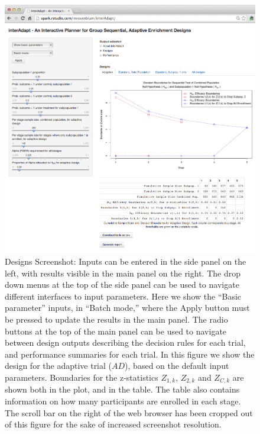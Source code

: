 \documentclass[article]{jss}
\begin{document}
\begin{figure}[h]
\centering{}\includegraphics[width=1\textwidth]{2014-02-29_screenshot_designs.png} 
\caption{Designs Screenshot: Inputs can be entered in the side panel on the left, with results visible in the main panel on the right. The drop down menus at the top of the side panel can be used to navigate different interfaces to input parameters. Here we show the ``Basic parameter'' inputs, in ``Batch mode,'' where the Apply button must be pressed to update the results in the main panel. The radio buttons at the top of the main panel can be used to navigate between design outputs describing the decision rules for each trial, and performance summaries for each trial. In this figure we show the design for the adaptive trial ($AD$), based on the default input parameters. Boundaries for the z-statistics $Z_{1,k}$, $Z_{2,k}$ and $Z_{C,k}$ are shown both in the plot, and in the table. The table also contains information on how many participants are enrolled in each stage. The scroll bar on the right of the web browser has been cropped out of this figure for the sake of increased screenshot resolution.  \label{fig:designs} }
\end{figure}
\end{document}
